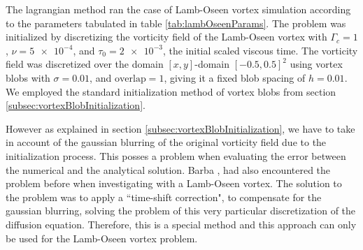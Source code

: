 The lagrangian method ran the case of Lamb-Oseen vortex simulation according to the parameters tabulated in table \ref{tab:lambOseenParams}. The problem was initialized by discretizing the vorticity field of the Lamb-Oseen vortex with $\Gamma_c=1$, $\nu=\num{5e-4}$, and $\tau_0 = \num{2e-3}$, the initial scaled viscous time. The vorticity field was discretized over the domain $[x,y]$-domain $\left[-0.5,0.5\right]^2$ using vortex blobs with $\sigma=0.01$, and $\mathrm{overlap}=1$, giving it a fixed blob spacing of $h=0.01$. We employed the standard initialization method of vortex blobs from section \ref{subsec:vortexBlobInitialization}. 

However as explained in section \ref{subsec:vortexBlobInitialization}, we have to take in account of the gaussian blurring of the original vorticity field due to the initialization process. This posses a problem when evaluating the error between the numerical and the analytical solution. Barba \cite{Barba2004c}, had also encountered the problem before when investigating with a Lamb-Oseen vortex. The solution to the problem was to apply a ``time-shift correction", to compensate for the gaussian blurring, solving the problem of this very particular discretization of the diffusion equation. Therefore, this is a special method and this approach can only be used for the Lamb-Oseen vortex problem.

